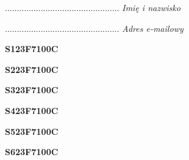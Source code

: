 \begin{turn}{90}\begin{minipage}{\linewidth} \vspace{20mm} ................................................  \textit{Imię i nazwisko}\end{minipage}\end{turn}

\begin{turn}{90}\begin{minipage}{\linewidth} \vspace{20mm} ................................................  \textit{Adres e-mailowy}\end{minipage}\end{turn}

\begin{turn}{90}\huge \begin{minipage}{\linewidth} \vspace{10mm}\textbf{S123F7100C}\end{minipage}\end{turn}

\begin{turn}{90}\huge \begin{minipage}{\linewidth} \vspace{10mm}\textbf{S223F7100C}\end{minipage}\end{turn}

\begin{turn}{90}\huge \begin{minipage}{\linewidth} \vspace{10mm}\textbf{S323F7100C}\end{minipage}\end{turn}

\begin{turn}{90}\huge \begin{minipage}{\linewidth} \vspace{10mm}\textbf{S423F7100C}\end{minipage}\end{turn}

\begin{turn}{90}\huge \begin{minipage}{\linewidth} \vspace{10mm}\textbf{S523F7100C}\end{minipage}\end{turn}

\begin{turn}{90}\huge \begin{minipage}{\linewidth} \vspace{10mm}\textbf{S623F7100C}\end{minipage}\end{turn}

